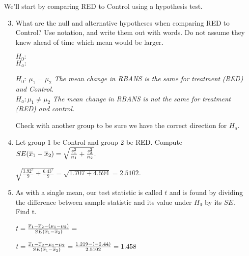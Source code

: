 We'll start by comparing RED to Control  using a hypothesis test.

\begin{enumerate}
\setcounter{enumi}{2}

\item  What are the null and alternative hypotheses when comparing RED
  to Control? Use notation, and write them out with words.
  Do not assume they knew ahead of time which  mean would be
  larger. \\
\begin{students}
 $H_0:$    \vspace{1cm}    \\ $H_a:$    \vspace{1cm}
\end{students}
\begin{key}
  {\it   $H_0:\ \mu_1 = \mu_2$ The mean change in RBANS is the same
    for treatment (RED) and Control.    \\ $H_a: \mu_1 \neq \mu_2$ The
    mean change in RBANS is not the same for treatment (RED) and control.  }
\end{key}

   Check with another group to be sure we have the correct
   direction for $H_a$.

\item  Let group 1 be Control and group 2 be RED. Compute $SE(\overline{x}_1 -
  \overline{x}_2) = \sqrt{\frac{s_1^2}{n_1} +     \frac{s_2^2}{n_2}}$. 
\begin{students}
    \vspace{2cm}    
\end{students}

\begin{key}
  {\it  $ \sqrt{\frac{3.92^2}{9} +    \frac{6.43^2}{9}} = \sqrt{1.707
    +4.594} = 2.5102$.} 
\end{key}
\item As with a single mean, our test statistic is called $t$ and is
  found by dividing  the difference between sample statistic and its
  value under $H_0$ by its $SE.$  Find t. \\
\begin{students}
  $ t = \frac{\overline{x}_1 - \overline{x}_2 - (\mu_1 - \mu_2)}{SE(\overline{x}_1-\overline{x}_2)} = $
    \vspace{2cm}    
\end{students}

\begin{key}
   $ t = \frac{\overline{x}_1 - \overline{x}_2 - \mu_1 - \mu_2}{SE(\overline{x}_1-\overline{x}_2)} = 
          \frac{ 1.219-( -2.44)}{2.5102} = 1.458 $
\end{key}


\end{enumerate}
